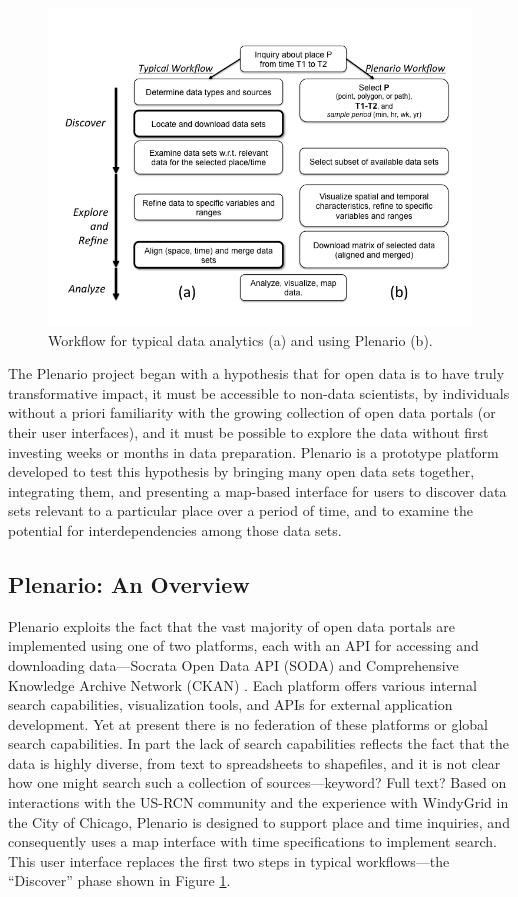 \documentclass[11pt]{article}
\begin{document}
\begin{figure}
	\centering
	\label{fig:plenario-workflow}
	\caption{Workflow for typical data analytics (a) and using Plenario (b).}
	\includegraphics[scale=.5]{plenario_workflow.png}
\end{figure}

The Plenario project began with a hypothesis that for open data is to have truly transformative impact, it must be accessible to non-data scientists, by individuals without a priori familiarity with the growing collection of open data portals (or their user interfaces), and it must be possible to explore the data without first investing weeks or months in data preparation. Plenario is a prototype platform developed to test this hypothesis by bringing many open data sets together, integrating them, and presenting a map-based interface for users to discover data sets relevant to a particular place over a period of time, and to examine the potential for interdependencies among those data sets.

\subsection{Plenario: An Overview}
Plenario exploits the fact that the vast majority of open data portals are implemented using one of two platforms, each with an API for accessing and downloading data---Socrata Open Data API (SODA) \cite{socrata} and Comprehensive Knowledge Archive Network (CKAN) \cite{ckan}. Each platform offers various internal search capabilities, visualization tools, and APIs for external application development. Yet at present there is no federation of these platforms or global search capabilities. In part the lack of search capabilities reflects the fact that the data is highly diverse, from text to spreadsheets to shapefiles, and it is not clear how one might search such a collection of sources---keyword? Full text? Based on interactions with the US-RCN community and the experience with WindyGrid in the City of Chicago, Plenario is designed to support place and time inquiries, and consequently uses a map interface with time specifications to implement search. This user interface replaces the first two steps in typical workflows---the ``Discover'' phase shown in Figure \ref{fig:plenario-workflow}.
\end{document}
